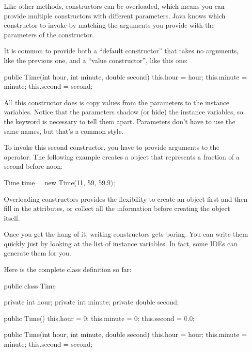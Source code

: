 
Like other methods, constructors can be overloaded, which means you can provide multiple constructors with different parameters.
Java knows which constructor to invoke by matching the arguments you provide with the parameters of the constructor.


It is common to provide both a ``default constructor'' that takes no arguments, like the previous one, and a ``value constructor'', like this one:

\begin{code}
public Time(int hour, int minute, double second) {
    this.hour = hour;
    this.minute = minute;
    this.second = second;
}
\end{code}


All this constructor does is copy values from the parameters to the instance variables.
Notice that the parameters shadow (or hide) the instance variables, so the keyword  is necessary to tell them apart.
Parameters don't have to use the same names, but that's a common style.


To invoke this second constructor, you have to provide arguments to the  operator.
The following example creates a  object that represents a fraction of a second before noon:

\begin{code}
Time time = new Time(11, 59, 59.9);
\end{code}

Overloading constructors provides the flexibility to create an object first and then fill in the attributes, or collect all the information before creating the object itself.

Once you get the hang of it, writing constructors gets boring.
You can write them quickly just by looking at the list of instance variables.
In fact, some IDEs can generate them for you.

Here is the complete class definition so far:


\begin{code}%
public class Time {
    private int hour;
    private int minute;
    private double second;

    public Time() {
        this.hour = 0;
        this.minute = 0;
        this.second = 0.0;
    }

    public Time(int hour, int minute, double second) {
        this.hour = hour;
        this.minute = minute;
        this.second = second;
    }
}
\end{code}


